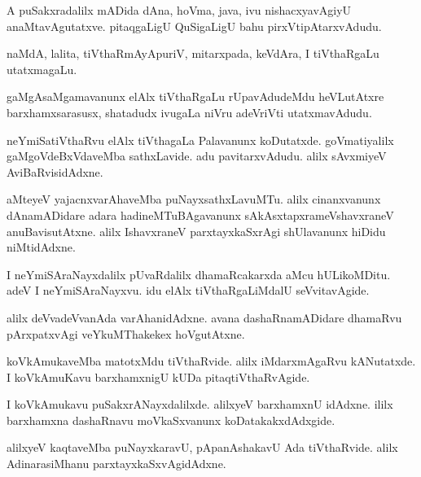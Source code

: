\documentclass{article}
\begin{document}
\begin{mn}
A puSakxradalilx mADida dAna, hoVma, java, ivu nishacxyavAgiyU
anaMtavAgutatxve. pitaqgaLigU QuSigaLigU bahu pirxVtipAtarxvAdudu.
\end{mn}

\begin{mn}
naMdA, lalita, tiVthaRmAyApuriV, mitarxpada, keVdAra, I tiVthaRgaLu utatxmagaLu.
\end{mn}

\begin{mn}
gaMgAsaMgamavanunx elAlx tiVthaRgaLu rUpavAdudeMdu heVLutAtxre
barxhamxsarasusx, shatadudx ivugaLa niVru adeVriVti utatxmavAdudu.
\end{mn}

\begin{mn}
neYmiSatiVthaRvu elAlx tiVthagaLa Palavanunx koDutatxde. goVmatiyalilx
gaMgoVdeBxVdaveMba sathxLavide. adu pavitarxvAdudu. alilx sAvxmiyeV AviBaRvisidAdxne.
\end{mn}

\begin{mn}
aMteyeV yajacnxvarAhaveMba puNayxsathxLavuMTu. alilx cinanxvanunx
dAnamADidare adara hadineMTuBAgavanunx sAkAsxtapxrameVshavxraneV
anuBavisutAtxne. alilx IshavxraneV parxtayxkaSxrAgi shUlavanunx hiDidu niMtidAdxne.
\end{mn}

\begin{mn}
I neYmiSAraNayxdalilx pUvaRdalilx dhamaRcakarxda aMcu
hULikoMDitu. adeV I neYmiSAraNayxvu. idu elAlx tiVthaRgaLiMdalU
seVvitavAgide. 
\end{mn}

\begin{mn}%
alilx deVvadeVvanAda varAhanidAdxne. avana dashaRnamADidare dhamaRvu
pArxpatxvAgi veYkuMThakekex hoVgutAtxne.
\end{mn}

\begin{mn}
koVkAmukaveMba matotxMdu tiVthaRvide. alilx iMdarxmAgaRvu
kANutatxde. I koVkAmuKavu barxhamxnigU kUDa pitaqtiVthaRvAgide.
\end{mn}

\begin{mn}%
I koVkAmukavu puSakxrANayxdalilxde. alilxyeV barxhamxnU idAdxne. ililx
barxhamxna dashaRnavu moVkaSxvanunx koDatakakxdAdxgide.
\end{mn}

\begin{mn}
alilxyeV kaqtaveMba puNayxkaravU, pApanAshakavU Ada tiVthaRvide. alilx
AdinarasiMhanu parxtayxkaSxvAgidAdxne.
\end{mn}
\end{document}
